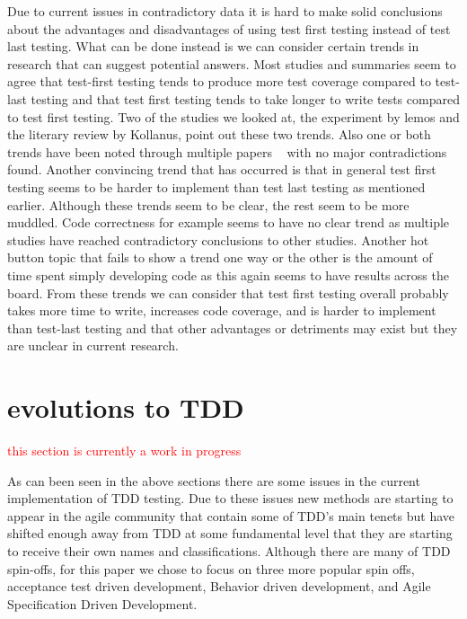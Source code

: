 \documentclass{sig-alternate}
\newcommand{\mycomment}[1]{\textcolor{red}{#1}}
\begin{document}
Due to current issues in contradictory data it is hard to make solid conclusions about the advantages and disadvantages of using test first testing instead of test last testing.  What can be done instead is we can consider certain trends in research that can suggest potential answers.  Most studies and summaries seem to agree that test-first testing tends to produce more test coverage compared to test-last testing and that test first testing tends to take longer to write tests compared to test first testing.  Two of the studies we looked at, the experiment by lemos and the literary review by Kollanus, point out these two trends.  Also one or both trends have been noted through multiple papers ~\cite{Kettunen:2010, Hammond:2012, Hellman:2012} with no major contradictions found.  Another convincing trend that has occurred is that in general test first testing seems to be harder to implement than test last testing as mentioned earlier.   Although these trends seem to be clear, the rest seem to be more muddled.  Code correctness for example seems to have no clear trend as multiple studies have reached contradictory conclusions to other studies.  Another hot button topic that fails to show a trend one way or the other is the amount of time spent simply developing code as this again seems to have results across the board.  From these trends we can consider that test first testing overall probably takes more time to write, increases code coverage, and is harder to implement than test-last testing and that other advantages or detriments may exist but they are unclear in current research.

\section{evolutions to TDD}
\mycomment{this section is currently a work in progress}

As can been seen in the above sections there are some issues in the current implementation of TDD testing.  Due to these issues new methods are starting to appear in the agile community that contain some of TDD's main tenets but have shifted enough away from TDD at some fundamental level that they are starting to receive their own names and classifications.  Although there are many of TDD spin-offs, for this paper we chose to focus on three more popular spin offs, acceptance test driven development, Behavior driven development, and Agile Specification Driven Development.
\end{document}
